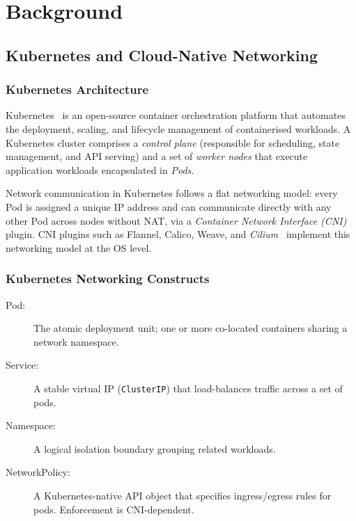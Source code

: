 \chapter{Background}
\label{ch:background}

\section{Kubernetes and Cloud-Native Networking}
\label{sec:bg_kubernetes}

\subsection{Kubernetes Architecture}
Kubernetes~\cite{kubernetes2014} is an open-source container orchestration platform
that automates the deployment, scaling, and lifecycle management of containerised
workloads. A Kubernetes cluster comprises a \emph{control plane} (responsible for
scheduling, state management, and API serving) and a set of \emph{worker nodes} that
execute application workloads encapsulated in \emph{Pods}.

Network communication in Kubernetes follows a flat networking model: every Pod is
assigned a unique IP address and can communicate directly with any other Pod across nodes
without NAT, via a \emph{Container Network Interface (CNI)} plugin. CNI plugins such as
Flannel, Calico, Weave, and \emph{Cilium}~\cite{cilium} implement this networking model
at the OS level.

\subsection{Kubernetes Networking Constructs}
\begin{description}
  \item[Pod:] The atomic deployment unit; one or more co-located containers sharing a
  network namespace.
  \item[Service:] A stable virtual IP (\texttt{ClusterIP}) that load-balances traffic
  across a set of pods.
  \item[Namespace:] A logical isolation boundary grouping related workloads.
  \item[NetworkPolicy:] A Kubernetes-native API object that specifies ingress/egress
  rules for pods. Enforcement is CNI-dependent.
\end{description}

